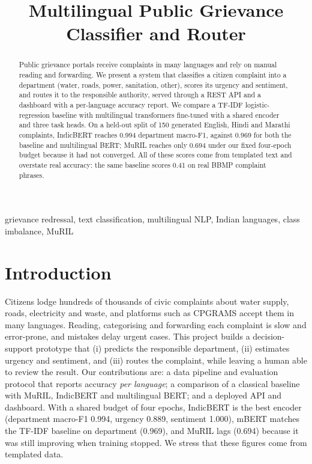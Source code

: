 \documentclass[conference]{IEEEtran}
\begin{document}
\title{Multilingual Public Grievance Classifier and Router}

\author{
}

\maketitle

\begin{abstract}
Public grievance portals receive complaints in many languages and rely on manual reading and forwarding.
We present a system that classifies a citizen complaint into a department (water, roads, power, sanitation, other),
scores its urgency and sentiment, and routes it to the responsible authority, served through a REST API and a dashboard
with a per-language accuracy report. We compare a TF-IDF logistic-regression baseline with multilingual transformers
fine-tuned with a shared encoder and three task heads. On a held-out split of 150 generated English, Hindi and Marathi complaints, IndicBERT reaches 0.994 department macro-F1, against 0.969 for both the baseline and multilingual BERT; MuRIL reaches only 0.694 under our fixed four-epoch budget because it had not converged. All of these scores come from templated text and overstate real accuracy: the same baseline scores 0.41 on real BBMP complaint phrases.
\end{abstract}

\begin{IEEEkeywords}
grievance redressal, text classification, multilingual NLP, Indian languages, class imbalance, MuRIL
\end{IEEEkeywords}

\section{Introduction}
Citizens lodge hundreds of thousands of civic complaints about water supply, roads, electricity and waste, and platforms such as CPGRAMS
accept them in many languages. Reading, categorising and forwarding each complaint is slow and error-prone, and mistakes delay urgent cases.
This project builds a decision-support prototype that (i) predicts the responsible department, (ii) estimates urgency and sentiment, and
(iii) routes the complaint, while leaving a human able to review the result. Our contributions are: a data pipeline and evaluation protocol
that reports accuracy \emph{per language}; a comparison of a classical baseline with MuRIL, IndicBERT and multilingual BERT;
and a deployed API and dashboard. With a shared budget of four epochs, IndicBERT is the best encoder (department macro-F1 0.994, urgency 0.889, sentiment 1.000), mBERT matches the TF-IDF baseline on department (0.969), and MuRIL lags (0.694) because it was still improving when training stopped. We stress that these figures come from templated data.
\end{document}
